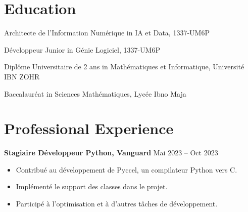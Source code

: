 \documentclass[a4paper,11pt]{article}%
\begin{document}
\section*{Education}%
\noindent{}\begin{minipage}[t]{\dimexpr\linewidth-3.5cm\relax}Architecte de l{\textquoteright}Information Num\'erique in IA et Data, 1337-UM6P\end{minipage}\par%
\noindent{}\begin{minipage}[t]{\dimexpr\linewidth-3.5cm\relax}D\'eveloppeur Junior in G\'enie Logiciel, 1337-UM6P\end{minipage}\par%
\noindent{}\begin{minipage}[t]{\dimexpr\linewidth-3.5cm\relax}Dipl\^ome Universitaire de 2 ans in Math\'ematiques et Informatique, Universit\'e IBN ZOHR\end{minipage}\par%
\noindent{}\begin{minipage}[t]{\dimexpr\linewidth-3.5cm\relax}Baccalaur\'eat in Sciences Math\'ematiques, Lyc\'ee Ibno Maja\end{minipage}\par%
\section*{Professional Experience}%
\textbf{Stagiaire D\'eveloppeur Python, Vanguard} \hfill Mai 2023 -- Oct 2023%
\begin{itemize}[leftmargin=*]%
\item Contribu\'e au d\'eveloppement de Pyccel, un compilateur Python vers C.%
\item Impl\'ement\'e le support des classes dans le projet.%
\item Particip\'e \`a l{\textquoteright}optimisation et \`a d{\textquoteright}autres t\^aches de d\'eveloppement.%
\end{itemize}%
\end{document}
